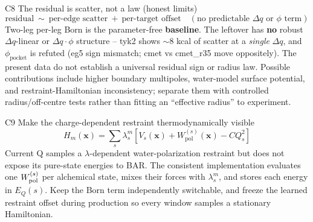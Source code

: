 \documentclass[11pt]{article}
\newcommand{\gap}{\vspace{10pt}}
\newcommand{\eq}[1]{{\large\[#1\]}}
\begin{document}
\begin{bridge}{C8 \;\textbullet\; The residual is scatter, not a law (honest limits)}
\eq{\text{residual}\ \sim\ \text{per-edge scatter}\ +\ \text{per-target offset}
   \quad(\text{no predictable }\Delta q\text{ or }\phi\text{ term})}
\small Two-leg per-leg Born is the parameter-free \textbf{baseline}. The leftover has \textbf{no} robust
$\Delta q$-linear or $\Delta q\!\cdot\!\phi$ structure -- tyk2 shows $\sim$8 kcal of scatter at a
\emph{single} $\Delta q$, and $\phi_{\text{pocket}}$ is refuted (eg5 sign mismatch; cmet vs cmet\_r35
move oppositely). The present data do not establish a universal residual sign or radius law.
Possible contributions include higher boundary multipoles, water-model surface potential, and
restraint-Hamiltonian inconsistency; separate them with controlled radius/off-centre tests rather
than fitting an ``effective radius'' to experiment.
\end{bridge}
\gap

\begin{bridge}{C9 \;\textbullet\; Make the charge-dependent restraint thermodynamically visible}
\eq{H_m(\mathbf{x})=\sum_s\lambda_s^m
   \left[V_s(\mathbf{x})+W_{\mathrm{pol}}^{(s)}(\mathbf{x})-C Q_s^2\right]}
\small Current Q samples a $\lambda$-dependent water-polarization restraint but does not expose its
pure-state energies to BAR. The consistent implementation evaluates one $W_{\rm pol}^{(s)}$ per
alchemical state, mixes their forces with $\lambda_s^m$, and stores each energy in $E_Q(s)$. Keep
the Born term independently switchable, and freeze the learned restraint offset during production
so every window samples a stationary Hamiltonian.
\end{bridge}
\end{document}
